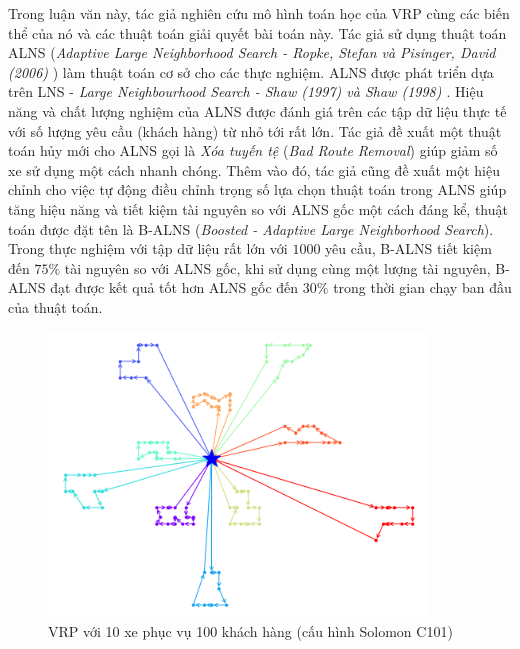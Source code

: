 Trong luận văn này, tác giả nghiên cứu mô hình toán học của VRP cùng các biến thể của nó và các thuật toán giải quyết bài toán này. Tác giả sử dụng thuật toán ALNS (\textit{Adaptive Large Neighborhood Search - Ropke, Stefan và Pisinger, David (2006)} \cite{ropke2006adaptive}) làm thuật toán cơ sở cho các thực nghiệm. ALNS được phát triển dựa trên LNS - \textit{Large Neighbourhood Search - Shaw (1997) \cite{shaw1997new} và Shaw (1998) \cite{shaw1998using}}. Hiệu năng và chất lượng nghiệm của ALNS được đánh giá trên các tập dữ liệu thực tế với số lượng yêu cầu (khách hàng) từ nhỏ tới rất lớn. Tác giả đề xuất một thuật toán hủy mới cho ALNS gọi là \textit{Xóa tuyến tệ} (\textit{Bad Route Removal}) giúp giảm số xe sử dụng một cách nhanh chóng. Thêm vào đó, tác giả cũng đề xuất một hiệu chỉnh cho việc tự động điều chỉnh trọng số lựa chọn thuật toán trong ALNS giúp tăng hiệu năng và tiết kiệm tài nguyên so với ALNS gốc một cách đáng kể, thuật toán được đặt tên là B-ALNS (\textit{Boosted - Adaptive Large Neighborhood Search}). Trong thực nghiệm với tập dữ liệu rất lớn với $1000$ yêu cầu, B-ALNS tiết kiệm đến $75\%$ tài nguyên so với ALNS gốc, khi sử dụng cùng một lượng tài nguyên, B-ALNS đạt được kết quả tốt hơn ALNS gốc đến $30\%$ trong thời gian chạy ban đầu của thuật toán.

\begin{figure}[H] %
  \centering %
  \includegraphics[width=0.9\textwidth]{figures/routes_c101.png} 
  \caption{VRP với 10 xe phục vụ 100 khách hàng (cấu hình Solomon C101)} 
\end{figure}

